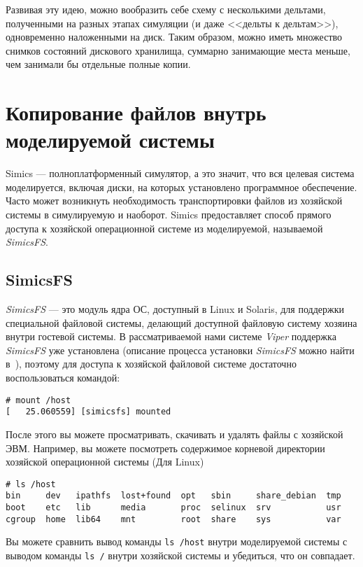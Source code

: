 Развивая эту идею, можно вообразить себе схему с несколькими дельтами, полученными на разных этапах симуляции (и даже <<дельты к дельтам>>), одновременно наложенными на диск. Таким образом, можно иметь множество снимков состояний дискового хранилища, суммарно занимающие места меньше, чем занимали бы отдельные полные копии.

\section{Копирование файлов внутрь моделируемой системы}

Simics --- полноплатформенный симулятор, а это значит, что вся целевая система моделируется, включая диски, на которых установлено программное обеспечение. Часто может возникнуть необходимость транспортировки файлов из хозяйской системы в симулируемую и наоборот. Simics предоставляет способ прямого доступа к хозяйской операционной системе из моделируемой, называемой \textit{SimicsFS}.

\subsection{SimicsFS}

\textit{SimicsFS} --- это модуль ядра ОС, доступный в Linux и Solaris, для поддержки специальной файловой системы, делающий доступной файловую систему хозяина внутри гостевой системы. В рассматриваемой нами системе \textit{Viper} поддержка \textit{SimicsFS} уже установлена (описание процесса установки \textit{SimicsFS} можно найти в~\cite{hindsight}), поэтому для доступа к хозяйской файловой системе достаточно воспользоваться командой:

\begin{lstlisting}
# mount /host
[   25.060559] [simicsfs] mounted
\end{lstlisting}

После этого вы можете просматривать, скачивать и удалять файлы с хозяйской ЭВМ. Например, вы можете посмотреть содержимое корневой директории хозяйской операционной системы (Для Linux)

\begin{lstlisting}
# ls /host
bin     dev   ipathfs  lost+found  opt   sbin     share_debian  tmp
boot    etc   lib      media       proc  selinux  srv           usr
cgroup  home  lib64    mnt         root  share    sys           var
\end{lstlisting}

Вы можете сравнить вывод команды \texttt{ls /host} внутри моделируемой системы с выводом команды \texttt{ls /} внутри хозяйской системы и убедиться, что он совпадает.

